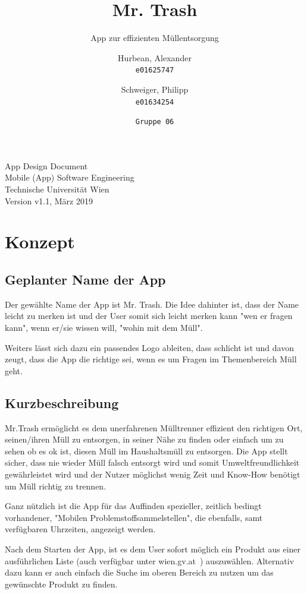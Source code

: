 \documentclass[12pt, a4paper]{scrreprt}
\title{\vspace{-1cm}Mr. Trash}
\subtitle{App zur effizienten Müllentsorgung}
\author{
    Hurbean, Alexander\\
    \texttt{e01625747}
    \and
    Schweiger, Philipp\\
    \texttt{e01634254}
    \and
    \texttt{Gruppe 06}}
\begin{document}
\maketitle

\null\vfill
\noindent
App Design Document\\ 
Mobile (App) Software Engineering\\
Technische Universität Wien\\
Version v1.1, März 2019
\newpage

\tableofcontents

\chapter{Konzept}

\section{Geplanter Name der App}
Der gewählte Name der App ist Mr. Trash. Die Idee dahinter ist, dass der Name leicht zu merken ist und der User somit sich leicht merken kann "wen er fragen kann", wenn er/sie wissen will, "wohin mit dem Müll".

Weiters lässt sich dazu ein passendes Logo ableiten, dass schlicht ist und davon zeugt, dass die App die richtige sei, wenn es um Fragen im Themenbereich Müll geht.

\section{Kurzbeschreibung}
Mr.Trash ermöglicht es dem unerfahrenen Mülltrenner effizient den richtigen Ort, seinen/ihren Müll zu entsorgen, in seiner Nähe zu finden oder einfach um zu sehen ob es ok ist, diesen Müll im Haushaltsmüll zu entsorgen. Die App stellt sicher, dass nie wieder Müll falsch entsorgt wird und somit Umweltfreundlichkeit gewährleistet wird und der Nutzer möglichst wenig Zeit und Know-How benötigt um Müll richtig zu trennen.

Ganz nützlich ist die App für das Auffinden spezieller, zeitlich bedingt vorhandener, "Mobilen Problemstoffsammelstellen", die ebenfalls, samt verfügbaren Uhrzeiten, angezeigt werden.

Nach dem Starten der App, ist es dem User sofort möglich ein Produkt aus einer ausführlichen Liste (auch verfügbar unter wien.gv.at~\cite{muelltrennabc}) auszuwählen. Alternativ dazu kann er auch einfach die Suche im oberen Bereich zu nutzen um das gewünschte Produkt zu finden.
\end{document}
